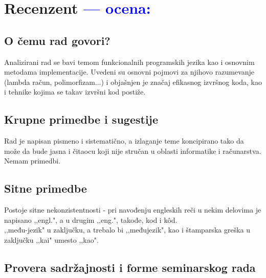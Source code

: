 \documentclass[a4paper]{report}
\newcommand{\odgovor}[1]{\textcolor{blue}{#1}}
\begin{document}
\chapter{Recenzent \odgovor{--- ocena:} }

\section{O čemu rad govori?}
Analizirani rad se bavi temom funkcionalnih programskih jezika kao i osnovnim metodama implementacije. Uvedeni su osnovni pojmovi za njihovo razumevanje (lambda račun, polimorfizam...) i objašnjen je značaj efikasnog izvršnog koda, kao i tehnike kojima se takav izvršni kod postiže.

\section{Krupne primedbe i sugestije}
Rad je napisan pismeno i sistematično, a izlaganje teme koncipirano tako da može da bude jasna i čitaocu koji nije stručan u oblasti informatike i računarstva. Nemam primedbi.

\section{Sitne primedbe}
Postoje sitne nekonzistentnosti - pri navođenju engleskih reči u nekim delovima je napisano ,,engl.", a u drugim ,,eng.", takođe, kod i k\^{o}d. \\ ,,među-jezik" u zaključku, a trebalo bi ,,međujezik", kao i štamparska greška u zaključku ,,kai" umesto ,,kao".


\section{Provera sadržajnosti i forme seminarskog rada}
\end{document}
